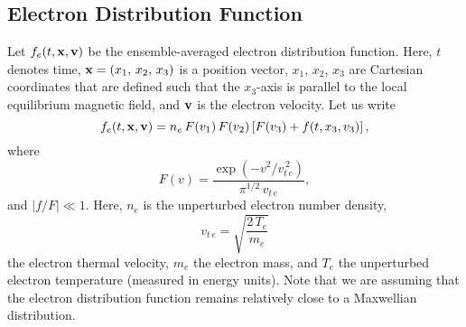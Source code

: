 \documentclass[12pt,prb,aps]{revtex4-1}
\begin{document}
\subsection{Electron Distribution Function}
Let $f_e(t,{\bf x},{\bf v})$ be the ensemble-averaged electron distribution function. Here, $t$ denotes time, ${\bf x}=(x_1,\, x_2,\, x_3)$
is a position vector,  $x_1$, $x_2$, $x_3$ are Cartesian coordinates that are defined such that the 
$x_3$-axis is parallel to the local equilibrium magnetic field, and ${\bf v}$ is the electron velocity. 
Let us write
\begin{equation}\label{e22}
f_e(t,{\bf x},{\bf v})= n_e\,F(v_1)\,F(v_2)\left[F(v_3)+ f (t,x_3,v_3)\right],
\end{equation}
where 
\begin{equation}
F(v) = \frac{\exp(-v^2/v_{t\,e}^{\,2})}{\pi^{1/2}\,v_{t\,e}},
\end{equation}
and 
$|f/F|\ll 1$. Here,  $n_e$ is the unperturbed electron number density, 
\begin{equation}\label{vte}
v_{t\,e} = \sqrt{\frac{2\,T_e}{m_e}}
\end{equation}
the electron thermal velocity, $m_e$  the electron mass,  and $T_e$ the unperturbed electron temperature (measured in energy units). Note that we are assuming that the electron distribution function remains relatively close to a Maxwellian distribution. 
\end{document}
